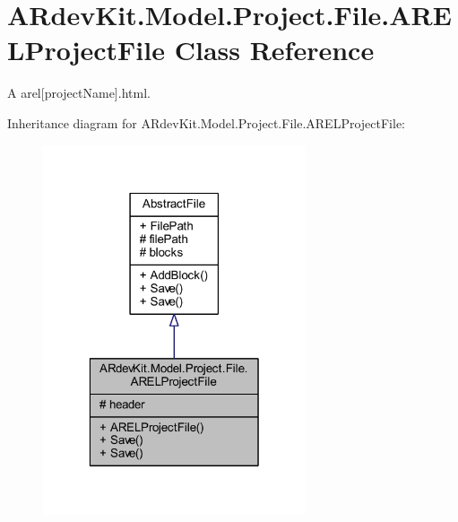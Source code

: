 \hypertarget{class_a_rdev_kit_1_1_model_1_1_project_1_1_file_1_1_a_r_e_l_project_file}{\section{A\-Rdev\-Kit.\-Model.\-Project.\-File.\-A\-R\-E\-L\-Project\-File Class Reference}
\label{class_a_rdev_kit_1_1_model_1_1_project_1_1_file_1_1_a_r_e_l_project_file}
}


A arel\mbox{[}project\-Name\mbox{]}.html.  




Inheritance diagram for A\-Rdev\-Kit.\-Model.\-Project.\-File.\-A\-R\-E\-L\-Project\-File\-:
\nopagebreak
\begin{figure}[H]
\begin{center}
\leavevmode
\includegraphics[width=220pt]{class_a_rdev_kit_1_1_model_1_1_project_1_1_file_1_1_a_r_e_l_project_file__inherit__graph}
\end{center}
\end{figure}



